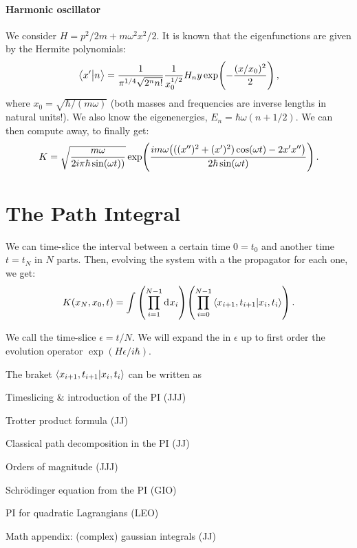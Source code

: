 \documentclass[main.tex]{subfiles}
\begin{document}
\paragraph{Harmonic oscillator}

We consider \(H = p^2/2m + m \omega^2 x^2 / 2\). It is known that the eigenfunctions are given by the Hermite polynomials: 
%
\begin{equation}
  \braket{x'}{n} = \frac{1}{\pi^{1/4} \sqrt{2^{n} n!}} \frac{1}{x_0^{1/2}} H_n y \exp(-\frac{(x/x_0)^2}{2}) 
\,,
\end{equation}
%
where \(x_0 = \sqrt{\hbar / (m \omega )} \) (both masses and frequencies are inverse lengths in natural units!). We also know the eigenenergies, \(E_n = \hbar \omega (n+1/2)\). We can then compute away, to finally get: 
%
\begin{equation}
  K = \sqrt{\frac{m \omega }{2 i \pi \hbar \sin(\omega t))}}
  \exp(\frac{im \omega \qty(((x'')^2+(x')^2)\cos(\omega t)-2x'x'' )}{2 \hbar \sin(\omega t) })  
\,.
\end{equation}
%

\section{The Path Integral}

We can time-slice the interval between a certain time \(0 = t_0\) and another time \(t = t_N\) in \(N\) parts. Then, evolving the system with a the propagator for each one, we get: 
%
\begin{equation}
  K(x_N, x_0, t) = 
  \int \qty(\prod _{i=1}^{N-1} \dd[]{x_i}) \qty(\prod_{i=0}^{N-1}\braket{x_{i+1}, t_{i+1}}{x_i, t_i})  
\,.
\end{equation}

We call the time-slice \(\epsilon = t/N\). We will expand the in \(\epsilon \) up to first order the evolution operator \(\exp(H \epsilon /i \hbar) \).

The braket \(\braket{
  x_{i+1}, t_{i+1}
}{
  x_{i}, t_{i}
} \) can be written as 

Timeslicing \& introduction of the PI (JJJ)

Trotter product formula (JJ)

Classical path decomposition in the PI (JJ)

Orders of magnitude (JJJ)

Schrödinger equation from the PI (GIO)

PI for quadratic Lagrangians (LEO)

Math appendix: (complex) gaussian integrals (JJ)
\end{document}
